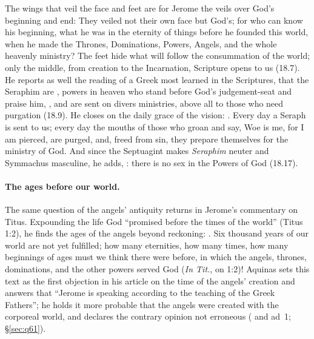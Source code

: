 The wings that veil the face and feet are for Jerome the veils over God's
beginning and end:  They veiled not their
own face but God's; for who can know his beginning, what he was in the
eternity of things before he founded this world, when he made the
Thrones, Dominations, Powers, Angels, and the whole heavenly ministry?
The feet hide what will follow the consummation of the world; only the
middle, from creation to the Incarnation, Scripture opens to us (18.7).
He reports as well the reading of a Greek most learned in the Scriptures,
that the Seraphim are , powers in
heaven who stand before God's judgement-seat and praise him, ,
and are sent on divers ministries, above all to those who need purgation
(18.9). He closes on the daily grace of the vision: . Every day a Seraph is sent to
us; every day the mouths of those who groan and say, Woe is me, for I am
pierced, are purged, and, freed from sin, they prepare themselves for the
ministry of God. And since the Septuagint makes \emph{Seraphim} neuter and
Symmachus masculine, he adds, : there is no sex in the Powers of God (18.17).

\paragraph{The ages before our world.} The same question of the angels'
antiquity returns in Jerome's commentary on Titus. Expounding the life
God ``promised before the times of the world'' (Titus 1:2), he finds the
ages of the angels beyond reckoning: . Six thousand years of our world are not yet
fulfilled; how many eternities, how many times, how many beginnings of
ages must we think there were before, in which the angels, thrones,
dominations, and the other powers served God (\emph{In Tit.}, on 1:2)!
Aquinas sets this text as the first objection in his article on the time
of the angels' creation and answers that ``Jerome is speaking according to
the teaching of the Greek Fathers''; he holds it more probable that the
angels were created with the corporeal world, and declares the contrary
opinion not erroneous ( and ad~1; \S\ref{sec:q61}).

